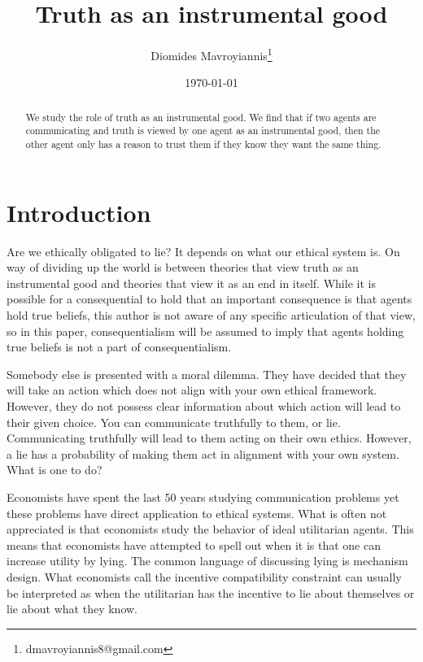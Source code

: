 \documentclass[11pt]{article}
\numberwithin{equation}{section}
\begin{document}
\begin{titlepage}
\title{Truth as an instrumental good}
\author{Diomides Mavroyiannis\footnote{dmavroyiannis8@gmail.com }}
\date{\today}
\maketitle
\begin{abstract}
\noindent We study the role of truth as an instrumental good. We find that if two agents are communicating and truth is viewed by one agent as an instrumental good, then the other agent only has a reason to trust them if they know they want the same thing. 


\bigskip
\end{abstract}
\setcounter{page}{0}
\thispagestyle{empty}
\end{titlepage}
\pagebreak \newpage

\section{Introduction}\label{sec:introduction}

Are we ethically obligated to lie? It depends on what our ethical system is. On way of dividing up the world is between theories that view truth as an instrumental good and theories that view it as an end in itself. While it is possible for a consequential to hold that an important consequence is that agents hold true beliefs, this author is not aware of any specific articulation of that view, so in this paper, consequentialism will be assumed to imply that agents holding true beliefs is not a part of consequentialism. 

Somebody else is presented with a moral dilemma. They have decided that they will take an action which does not align with your own ethical framework. However, they do not possess clear information about which action will lead to their given choice. You can communicate truthfully to them, or lie. Communicating truthfully will lead to them acting on their own ethics. However, a lie has a probability of making them act in alignment with your own system. What is one to do? 

Economists have spent the last 50 years studying communication problems yet these problems have direct application to ethical systems. What is often not appreciated is that economists study the behavior of ideal utilitarian agents. This means that economists have attempted to spell out when it is that one can increase utility by lying. The common language of discussing lying is mechanism design. What economists call the incentive compatibility constraint can usually be interpreted as when the utilitarian has the incentive to lie about themselves or lie about what they know. 
\end{document}
